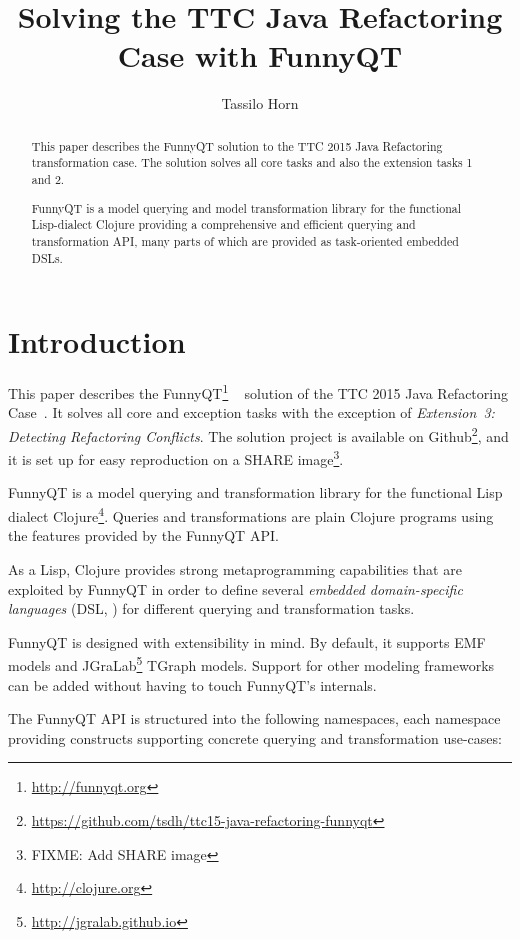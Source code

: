 \documentclass[submission]{eptcs}
\title{Solving the TTC Java Refactoring Case with FunnyQT}
\author{Tassilo Horn
  \institute{Institute for Software Technology, University Koblenz-Landau, Germany}
  \email{horn@uni-koblenz.de}}
\begin{document}
\maketitle

\begin{abstract}
  This paper describes the FunnyQT solution to the TTC 2015 Java Refactoring
  transformation case.  The solution solves all core tasks and also the
  extension tasks 1 and 2.

  FunnyQT is a model querying and model transformation library for the
  functional Lisp-dialect Clojure providing a comprehensive and efficient
  querying and transformation API, many parts of which are provided as
  task-oriented embedded DSLs.
\end{abstract}


\section{Introduction}
\label{sec:introduction}

This paper describes the FunnyQT\footnote{\url{http://funnyqt.org}}
~\cite{Horn2013MQWFQ,funnyqt-icgt15} solution of the TTC 2015 Java Refactoring
Case~\cite{java-refactoring-case-desc}.  It solves all core and exception tasks
with the exception of \emph{Extension~3: Detecting Refactoring Conflicts}.  The
solution project is available on
Github\footnote{\url{https://github.com/tsdh/ttc15-java-refactoring-funnyqt}},
and it is set up for easy reproduction on a SHARE image\footnote{FIXME: Add
  SHARE image}.

FunnyQT is a model querying and transformation library for the functional Lisp
dialect Clojure\footnote{\url{http://clojure.org}}.  Queries and
transformations are plain Clojure programs using the features provided by the
FunnyQT API.

As a Lisp, Clojure provides strong metaprogramming capabilities that are
exploited by FunnyQT in order to define several \emph{embedded domain-specific
  languages} (DSL, \cite{book:Fowler2010DSL}) for different querying and
transformation tasks.

FunnyQT is designed with extensibility in mind.  By default, it supports EMF
\cite{Steinberg2008EEM} models and
JGraLab\footnote{\url{http://jgralab.github.io}} TGraph models.  Support for
other modeling frameworks can be added without having to touch FunnyQT's
internals.

The FunnyQT API is structured into the following namespaces, each namespace
providing constructs supporting concrete querying and transformation use-cases:
\end{document}
